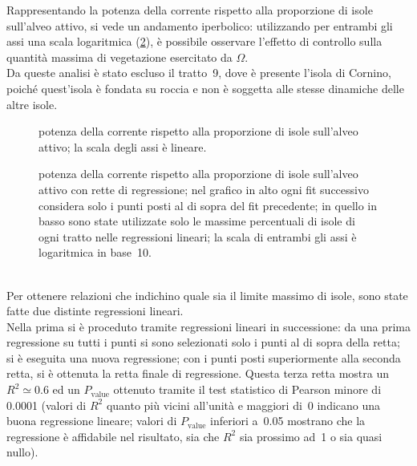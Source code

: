 Rappresentando la potenza della corrente rispetto alla proporzione di isole sull'alveo attivo, si vede un andamento iperbolico: utilizzando per entrambi gli assi una scala logaritmica (\cref{graph:omega-area-percentuale}), è possibile osservare l'effetto di controllo sulla quantità massima di vegetazione esercitato da $\Omega$.
\\
Da queste analisi è stato escluso il tratto~9, dove è presente l'isola di Cornino, poiché quest'isola è fondata su roccia e non è soggetta alle stesse dinamiche delle altre isole.
%
\begin{figure}
	\centering
	
	\caption[potenza della corrente rispetto alla proporzione di isole sull'alveo attivo, grafico lineare]{potenza della corrente rispetto alla proporzione di isole sull'alveo attivo; la scala degli assi è lineare.}
	\label{graph:omega-area-percentuale-linear}
\end{figure}
%
\begin{figure}
	\centering
	
	\caption[potenza della corrente rispetto alla proporzione di isole sull'alveo attivo, grafici bilogaritmico]{potenza della corrente rispetto alla proporzione di isole sull'alveo attivo con rette di regressione; nel grafico in alto ogni fit successivo considera solo i punti posti al di sopra del fit precedente; in quello in basso sono state utilizzate solo le massime percentuali di isole di ogni tratto nelle regressioni lineari; la scala di entrambi gli assi è logaritmica in base~\num{10}.}
	\label{graph:omega-area-percentuale}
\end{figure}
%
%	
%
\\
Per ottenere relazioni che indichino quale sia il limite massimo di isole, sono state fatte due distinte regressioni lineari.
\\
Nella prima si è proceduto tramite regressioni lineari in successione: da una prima regressione su tutti i punti si sono selezionati solo i punti al di sopra della retta; si è eseguita una nuova regressione; con i punti posti superiormente alla seconda retta, si è ottenuta la retta finale di regressione.
Questa terza retta mostra un $R^2 \simeq 0.6$ ed un $P_\mathrm{value}$ ottenuto tramite il test statistico di Pearson minore di \num{0.0001} (valori di $R^2$ quanto più vicini all'unità e maggiori di~\num{0} indicano una buona regressione lineare; valori di $P_\mathrm{value}$ inferiori a~\num{0.05} mostrano che la regressione è affidabile nel risultato, sia che $R^2$ sia prossimo ad~\num{1} o sia quasi nullo).
